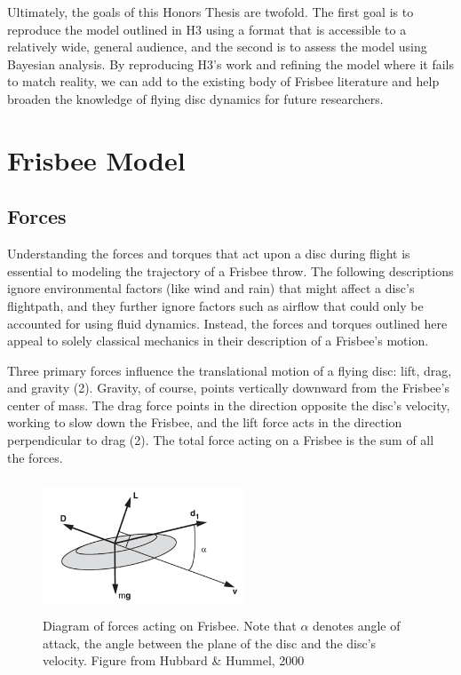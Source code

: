 \documentclass[a4paper,12pt, oneside]{article}
\begin{document}
Ultimately, the goals of this Honors Thesis are twofold. The first goal is to reproduce the model outlined in H3 using a format that is accessible to a relatively wide, general audience, and the second is to assess the model using Bayesian analysis. By reproducing H3's work and refining the model where it fails to match reality, we can add to the existing body of Frisbee literature and help broaden the knowledge of flying disc dynamics for future researchers.

\section{Frisbee Model}

\subsection{Forces}
Understanding the forces and torques that act upon a disc during flight is essential to modeling the trajectory of a Frisbee throw. The following descriptions ignore environmental factors (like wind and rain) that might affect a disc's flightpath, and they further ignore factors such as airflow that could only be accounted for using fluid dynamics. Instead, the forces and torques outlined here appeal to solely classical mechanics in their description of a Frisbee's motion.

Three primary forces influence the translational motion of a flying disc: lift, drag, and gravity (2). Gravity, of course, points vertically downward from the Frisbee's center of mass.  The drag force points in the direction opposite the disc's velocity, working to slow down the Frisbee, and the lift force acts in the direction perpendicular to drag (2). The total force acting on a Frisbee is the sum of all the forces.
\begin{figure}[h]
        \includegraphics[width=6cm, height=4cm]{frisforces}
	\centering
	\caption{Diagram of forces acting on Frisbee. Note that $\alpha$ denotes angle of attack, the angle between the plane of the disc and the disc's velocity. Figure from Hubbard \& Hummel, 2000}
\end{figure}
\end{document}
